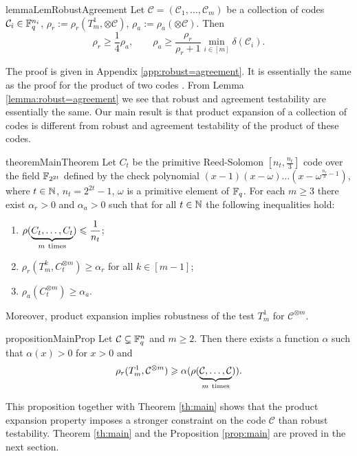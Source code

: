\documentclass[11pt]{article}
\newcommand{\cC}{\mathcal{C}}
\newcommand{\cCpow}[1]{\cC^{\otimes #1}}
\begin{document}
\newcommand{\cI}{\mathcal{I}}
\begin{restatable}[Robust testability + Linear distance = Agreement testability]{lemma}{LemRobustAgreement}\label{lemma:robust=agreement}
    Let $\cC=(\cC_1,\ldots,\cC_m)$ be a collection of codes $\cC_i\in\F_q^{n_i}$, $\rho_r:=\rho_r(T_m^1,\otimes\cC)$, $\rho_a:=\rho_a(\otimes\cC)$. Then
    \[
    \rho_r\ge \frac14\rho_a,\qquad \rho_a\ge \frac{\rho_r}{\rho_r+1}\min_{i\in[m]}\delta(\cC_i).
    \]
\end{restatable}
The proof is given in Appendix \ref{app:robust=agreement}. It is essentially the same as the proof for the product of two codes \cite[Lemma 2.9]{Dinur:stoc2022}.
From Lemma \ref{lemma:robust=agreement} we see that robust and agreement testability are essentially the same. 
Our main result is that product expansion of a collection of codes is different from robust and agreement testability of the product of these codes.
\begin{restatable}{theorem}{MainTheorem}\label{th:main}
    Let $C_t$ be the primitive Reed-Solomon $[n_t,\frac{n_t}{3}]$ code over the field $\mathbb{F}_{2^{2t}}$ defined by the check polynomial $(x-1)(x-\omega)\ldots (x-\omega^{\frac{n_t}{3}-1})$, where $t\in\mathbb{N}$, $n_t=2^{2t}-1$, $\omega$ is a primitive element of $\mathbb{F}_q$. 
    For each $m\ge 3$ there exist $\alpha_r>0$ and $\alpha_a>0$ such that for all $t\in\mathbb{N}$ the following inequalities hold:
    \begin{enumerate}
        \item $\rho(\underbrace{C_t,\ldots,C_t}_{m\ \mbox{\scriptsize\rm times}})\le \displaystyle\frac{1}{n_t}$;
        \item $\rho_r(T_m^k, C_t^{\otimes m})\ge \alpha_r$ for all $k\in[m-1]$;
        \item $\rho_a(C_t^{\otimes m})\ge \alpha_a.$
    \end{enumerate}
\end{restatable}
Moreover, product expansion implies robustness of the test $T_m^1$ for $\cCpow{m}$.
\begin{restatable}{proposition}{MainProp}\label{prop:main}
    Let $\cC\subsetneq\F_q^n$ and $m\ge 2$. Then there exists a function $\alpha$ such that $\alpha(x)>0$ for $x>0$ and
    \[
    \rho_r(T_m^1,\cCpow{m})\ge \alpha(\rho(\underbrace{\cC,\ldots,\cC}_{m\ \mbox{\scriptsize\rm times}})).
    \]
\end{restatable}
This proposition together with Theorem \ref{th:main} shows that the product expansion property imposes a stronger constraint on the code $\cC$ than robust testability.
Theorem \ref{th:main} and the Proposition \ref{prop:main} are proved in the next section.
\end{document}
